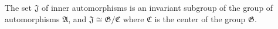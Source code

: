 The set $\mathfrak{J}$ of inner automorphisms is an invariant subgroup of the group of automorphisms $\mathfrak{A}$, and $\mathfrak{J} \cong \mathfrak{G}/\mathfrak{C}$ where $\mathfrak{C}$ is the center of the group $\mathfrak{G}$.
